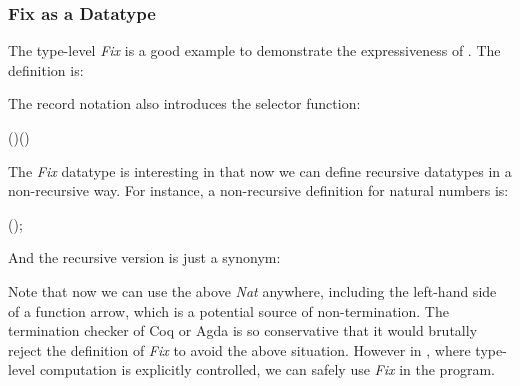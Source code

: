 \subsubsection{Fix as a Datatype}
The type-level \emph{Fix} is a good example to demonstrate the
expressiveness of \sufcc. The definition is:
\resethooks
The record notation also introduces the selector function:
\begin{hscode}\SaveRestoreHook
{}%
%
%
\>[3]{}\mathbin{:}(\mathbin{:}\star\to \star)\to {}\;\to {}\;(\;){}\<[E]%
\ColumnHook
\end{hscode}\resethooks
The \emph{Fix} datatype is interesting in that now we can define
recursive datatypes in a non-recursive way. For instance, a
non-recursive definition for natural numbers is:
\begin{hscode}\SaveRestoreHook
{}%
%
%
\>[3]{}\;\;(\mathbin{:}\star)\mathrel{=}\mid {}\;;{}\<[E]%
\ColumnHook
\end{hscode}\resethooks
And the recursive version is just a synonym:
\begin{hscode}\SaveRestoreHook
{}%
%
%
\>[3]{}\;\mathbin{:}\star\mathrel{=}\;\<[E]%
\ColumnHook
\end{hscode}\resethooks

Note that now we can use the above \emph{Nat} anywhere, including the
left-hand side of a function arrow, which is a potential source of
non-termination. The termination checker of Coq or Agda is so
conservative that it would brutally reject the definition of
\emph{Fix} to avoid the above situation. 
 However in \sufcc, where type-level computation is
explicitly controlled, we can safely use \emph{Fix} in the program.

